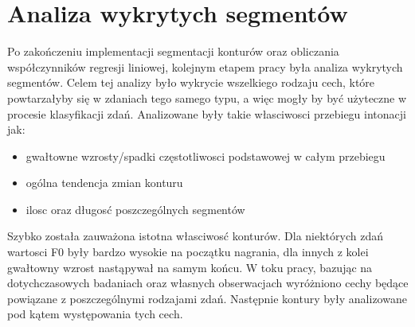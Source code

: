 \documentclass[a4paper,12 pt]{report}
\begin{document}
\chapter{Analiza wykrytych segmentów}
Po zakończeniu implementacji segmentacji konturów oraz obliczania współczynników regresji liniowej, kolejnym etapem pracy była analiza wykrytych segmentów. Celem tej analizy było wykrycie wszelkiego rodzaju cech, które powtarzałyby się w zdaniach tego samego typu, a więc mogły by być użyteczne w procesie klasyfikacji zdań. 
Analizowane były takie własciwosci przebiegu intonacji jak:
\begin{itemize}
\item{gwałtowne wzrosty/spadki częstotliwosci podstawowej w całym przebiegu }
\item{ogólna tendencja zmian konturu}
\item{ilosc oraz długosć poszczególnych segmentów}
\end{itemize}

Szybko została zauważona istotna własciwosć konturów. Dla niektórych zdań wartosci F0 były bardzo wysokie na początku nagrania, dla innych z kolei gwałtowny wzrost nastąpywał na samym końcu. 
W toku pracy, bazując na dotychczasowych badaniach oraz własnych obserwacjach wyróżniono cechy będące powiązane z poszczególnymi rodzajami zdań. Następnie kontury były analizowane pod kątem występowania tych cech.
\end{document}
